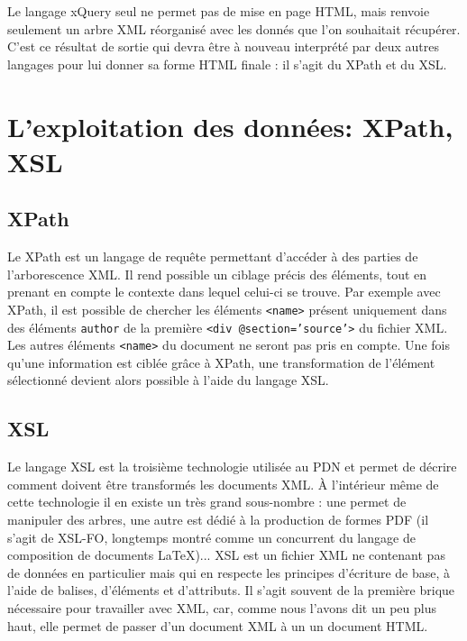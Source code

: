 \documentclass[a4paper,12pt,twoside]{book}
\begin{document}
Le langage xQuery seul ne permet pas de mise en page HTML, mais renvoie seulement un arbre XML réorganisé avec les donnés que l'on souhaitait récupérer. C'est ce résultat de sortie qui devra être à nouveau interprété par deux autres langages pour lui donner sa forme HTML finale : il s'agit du XPath et du XSL.


    \section{L'exploitation des données: XPath, XSL}

    
    \subsection{XPath}
    Le \acrfull{XPath} est un langage de requête permettant d'accéder à des parties de l'arborescence XML. Il rend possible un ciblage précis des éléments, tout en prenant en compte le contexte dans lequel celui-ci se trouve. Par exemple avec XPath, il est possible de chercher les éléments \texttt{<name>} présent uniquement dans des éléments \texttt{author} de la première \texttt{<div @section='source'>} du fichier XML. Les autres éléments \texttt{<name>} du document ne seront pas pris en compte. Une fois qu'une information est ciblée grâce à XPath, une transformation de l'élément sélectionné devient alors possible à l'aide du langage XSL.
    
    \subsection{XSL}
    Le langage \acrfull{XSL} est la troisième technologie utilisée au \acrshort{PDN} et permet de décrire comment doivent être transformés les documents XML. À l'intérieur même de cette technologie il en existe un très grand sous-nombre : une permet de manipuler des arbres, une autre est dédié à la production de formes PDF (il s'agit de \acrshort{XSL-FO}, longtemps montré comme un concurrent du langage de composition de documents \LaTeX)... \acrshort{XSL} est un fichier \acrshort{XML} ne contenant pas de données en particulier mais qui en respecte les principes d'écriture de base, à l'aide de balises, d'éléments et d'attributs. Il s'agit souvent de la première brique nécessaire pour travailler avec \acrshort{XML}, car, comme nous l'avons dit un peu plus haut, elle permet de passer d'un document \acrshort{XML} à un un document \acrshort{HTML}.
    
\end{document}
